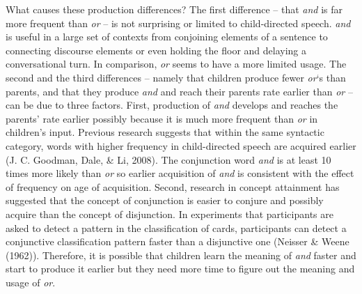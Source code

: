 \documentclass[oneside]{report}
\theoremstyle{definition}
\theoremstyle{definition}
\theoremstyle{definition}
\theoremstyle{remark}
\begin{document}
What causes these production differences? The first difference -- that
\emph{and} is far more frequent than \emph{or} -- is not surprising or
limited to child-directed speech. \emph{and} is useful in a large set of
contexts from conjoining elements of a sentence to connecting discourse
elements or even holding the floor and delaying a conversational turn.
In comparison, \emph{or} seems to have a more limited usage. The second
and the third differences -- namely that children produce fewer
\emph{or}`s than parents, and that they produce \emph{and} and reach
their parents rate earlier than \emph{or} -- can be due to three
factors. First, production of \emph{and} develops and reaches the
parents' rate earlier possibly because it is much more frequent than
\emph{or} in children's input. Previous research suggests that within
the same syntactic category, words with higher frequency in
child-directed speech are acquired earlier (J. C. Goodman, Dale, \& Li,
2008). The conjunction word \emph{and} is at least 10 times more likely
than \emph{or} so earlier acquisition of \emph{and} is consistent with
the effect of frequency on age of acquisition. Second, research in
concept attainment has suggested that the concept of conjunction is
easier to conjure and possibly acquire than the concept of disjunction.
In experiments that participants are asked to detect a pattern in the
classification of cards, participants can detect a conjunctive
classification pattern faster than a disjunctive one (Neisser \& Weene
(1962)). Therefore, it is possible that children learn the meaning of
\emph{and} faster and start to produce it earlier but they need more
time to figure out the meaning and usage of \emph{or}.
\end{document}

